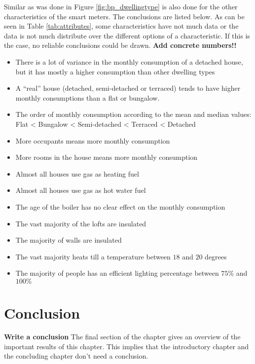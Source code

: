 Similar as was done in Figure \ref{fig:bp_dwellingtype} is also done for the other characteristics of the smart meters. The conclusions are listed below. As can be seen in Table \ref{tab:attributes}, some characteristics have not much data or the data is not much distribute over the different options of a characteristic. If this is the case, no reliable conclusions could be drawn. \textbf{Add concrete numbers!!}

\begin{itemize}
	\item There is a lot of variance in the monthly consumption of a detached house, but it has mostly a higher consumption than other dwelling types
	\item A ``real'' house (detached, semi-detached or terraced) tends to have higher monthly consumptions than a flat or bungalow.  
	\item The order of monthly consumption according to the mean and median values: Flat < Bungalow < Semi-detached < Terraced < Detached
	\item More occupants means more monthly consumption
	\item More rooms in the house means more monthly consumption
	\item Almost all houses use gas as heating fuel
	\item Almost all houses use gas as hot water fuel
	\item The age of the boiler has no clear effect on the monthly consumption
	\item The vast majority of the lofts are insulated
	\item The majority of walls are insulated
	\item The vast majority heats till a temperature between $ 18 $ and $ 20  $ degrees
	\item The majority of people has an efficient lighting percentage between $ 75\% $ and $ 100\% $
	
\end{itemize}



\section{Conclusion}
\textbf{Write a conclusion}
The final section of the chapter gives an overview of the important results
of this chapter. This implies that the introductory chapter and the
concluding chapter don't need a conclusion.




